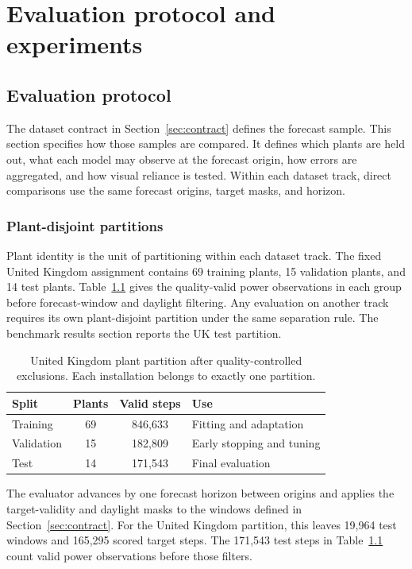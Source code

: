 \chapter{Evaluation protocol and experiments}
\label{cha:evaluation}
\label{cha:protocol}
\section{Evaluation protocol}
\label{sec:evaluation-protocol}

The dataset contract in Section~\ref{sec:contract} defines the forecast sample. This section specifies how those samples are compared. It defines which plants are held out, what each model may observe at the forecast origin, how errors are aggregated, and how visual reliance is tested. Within each dataset track, direct comparisons use the same forecast origins, target masks, and horizon.

\subsection{Plant-disjoint partitions}

Plant identity is the unit of partitioning within each dataset track. The fixed United Kingdom assignment contains 69 training plants, 15 validation plants, and 14 test plants. Table~\ref{tab:uk-partition} gives the quality-valid power observations in each group before forecast-window and daylight filtering. Any evaluation on another track requires its own plant-disjoint partition under the same separation rule. The benchmark results section reports the UK test partition.

\begin{table}[htbp]
\centering
\begin{tabular}{@{}lccl@{}}
\hline
Split & Plants & Valid steps & Use \\
\hline
Training & 69 & 846,633 & Fitting and adaptation \\
Validation & 15 & 182,809 & Early stopping and tuning \\
Test & 14 & 171,543 & Final evaluation \\
\hline
\end{tabular}
\caption{United Kingdom plant partition after quality-controlled exclusions. Each installation belongs to exactly one partition.}
\label{tab:uk-partition}
\end{table}

The evaluator advances by one forecast horizon between origins and applies the target-validity and daylight masks to the windows defined in Section~\ref{sec:contract}. For the United Kingdom partition, this leaves 19,964 test windows and 165,295 scored target steps. The 171,543 test steps in Table~\ref{tab:uk-partition} count valid power observations before those filters.

